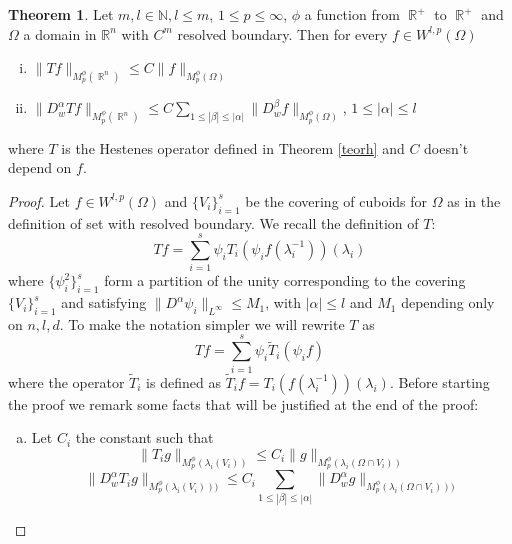 \documentclass[12pt]{article}
\theoremstyle{definition}
\newtheorem{theorem}{Theorem}
\DeclareMathOperator\rr{\mathbb{R}}
\begin{document}
\begin{theorem}
Let $m,l \in \mathbb{N}, l\le m$, $1\le p\le\infty$, $\phi$ a function from $\rr^+$ to $\rr^+$ and $\Omega$ a domain in $\mathbb{R}^n$ with $C^m$ resolved boundary. Then for every $f \in W^{l,p}(\Omega)$ 
\begin{enumerate}[i)]
\item  $\| Tf\|_{M_p^\phi(\rr^n)} \le    C\| f\|_{M_p^\phi(\Omega)}$
\item $\| D^\alpha_w Tf\|_{M_p^\phi(\rr^n)} \le   C\sum_{1\le |\beta|\le|\alpha| }\| D^\beta_wf\|_{M_p^\phi(\Omega)}$,  $1\le |\alpha|\le l$
\end{enumerate}
where $ T$ is the Hestenes operator defined in Theorem \ref{teorh} and $C$ doesn't depend on $f$.
\end{theorem}
\begin{proof}
Let $f \in W^{l,p}(\Omega)$ and  $\{V_i\}_{i=1}^s$ be the covering of cuboids for $\Omega$ as in the definition of set with resolved boundary. We recall the definition of $T:$
\[ Tf = \sum_{i=1}^s \psi_iT_i(\psi_if(\lambda_i^{-1}))(\lambda_i)\]
where $\{ \psi^2_i \}_{i=1}^s$ form a partition of the unity corresponding to the covering $\{V_i\}_{i=1}^s$ and satisfying $\|D^\alpha \psi_i \|_{L^\infty}\le M_1$, with $|\alpha|\le l$ and $M_1$ depending only on $n,l,d$. To make the notation simpler we will rewrite $T$ as
\[ Tf = \sum_{i=1}^s \psi_i\widetilde T_i(\psi_if)\]
where the operator $\widetilde T_i$ is defined as $\widetilde T_i f = T_i(f(\lambda_i^{-1}))(\lambda_i)$. 
Before starting the proof we remark some facts that will be justified at the end of the proof:
\begin{enumerate}[a)]

\item Let $C_i$ the constant such that
\[ \| T_ig\|_{M_p^\phi(\lambda_i(V_i))}\le C_i \|g\|_{M_p^\phi(\lambda_i(\Omega \cap V_i))}\]
\[\| D^\alpha_w T_ig\|_{M_p^\phi(\lambda_i(V_i)))} \le   C_i\sum_{1\le |\beta|\le|\alpha| }\| D^\alpha_wg\|_{M_p^\phi(\lambda_i(\Omega \cap V_i)))}\]  


\end{enumerate}
\end{proof}
\end{document}

